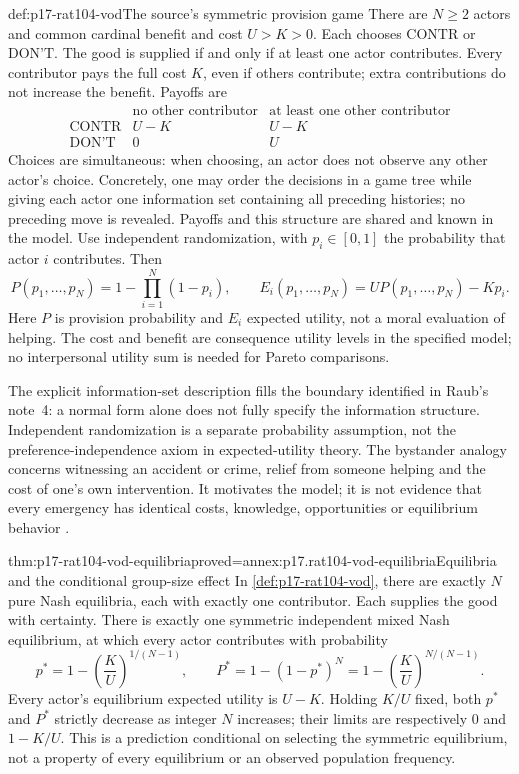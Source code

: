 \begin{hbdefinition}{def:p17-rat104-vod}{The source's symmetric provision game}
There are \(N\geq2\) actors and common cardinal benefit and cost
\(U>K>0\). Each chooses \(\mathrm{CONTR}\) or \(\text{DON'T}\).
The good is supplied if and only if at least one actor contributes.
Every contributor pays the full cost \(K\), even if others contribute;
extra contributions do not increase the benefit. Payoffs are
\[
\begin{array}{c|cc}
 &\text{no other contributor}&\text{at least one other contributor}\\ \hline
\mathrm{CONTR}&U-K&U-K\\
\text{DON'T}&0&U
\end{array}
\]
Choices are simultaneous: when choosing, an actor does not observe any
other actor's choice. Concretely, one may order the decisions in a game
tree while giving each actor one information set containing all preceding
histories; no preceding move is revealed. Payoffs and this structure are
shared and known in the model. Use independent randomization, with
\(p_i\in[0,1]\) the probability that actor \(i\) contributes.
Then
\[
 P(p_1,\ldots,p_N)=1-\prod_{i=1}^N(1-p_i),\qquad
 E_i(p_1,\ldots,p_N)=U P(p_1,\ldots,p_N)-Kp_i.
\]
Here \(P\) is provision probability and \(E_i\) expected utility,
not a moral evaluation of helping. The cost and benefit are consequence
utility levels in the specified model; no interpersonal utility sum is
needed for Pareto comparisons.
\end{hbdefinition}

The explicit information-set description fills the boundary identified in
Raub's note~4: a normal form alone does not fully specify the information
structure. Independent randomization is a separate probability assumption,
not the preference-independence axiom in expected-utility theory. The
bystander analogy concerns witnessing an accident or crime, relief from
someone helping and the cost of one's own intervention. It motivates the
model; it is not evidence that every emergency has identical costs, knowledge,
opportunities or equilibrium behavior
\parencite[pp.~613--614, note~4 on p.~620]{Raub2021RationalChoiceSocialSciences}.

\begin{hbtheorem}{thm:p17-rat104-vod-equilibria}{proved=annex:p17.rat104-vod-equilibria}{Equilibria and the conditional group-size effect}
In \cref{def:p17-rat104-vod}, there are exactly \(N\) pure Nash
equilibria, each with exactly one contributor. Each supplies the good
with certainty. There is exactly one symmetric independent mixed Nash
equilibrium, at which every actor contributes with probability
\[
 p^*=1-\left(\frac KU\right)^{1/(N-1)},\qquad
 P^*=1-(1-p^*)^N
     =1-\left(\frac KU\right)^{N/(N-1)}.
\]
Every actor's equilibrium expected utility is \(U-K\). Holding \(K/U\)
fixed, both \(p^*\) and \(P^*\) strictly decrease as integer \(N\)
increases; their limits are respectively \(0\) and \(1-K/U\).
This is a prediction conditional on selecting the symmetric equilibrium,
not a property of every equilibrium or an observed population frequency.
\end{hbtheorem}

